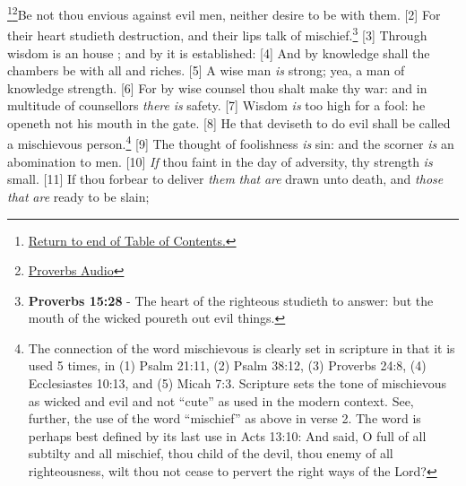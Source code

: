 \footnote{\textcolor[cmyk]{0.99998,1,0,0}{\hyperlink{TOC}{Return to end of Table of Contents.}}}\footnote{\href{https://audiobible.com/bible/}{\textcolor[cmyk]{0.99998,1,0,0}{Proverbs Audio}}}\textcolor[cmyk]{0.99998,1,0,0}{Be not thou envious against evil men, neither desire to be with them.}
[2] \textcolor[cmyk]{0.99998,1,0,0}{For their heart studieth destruction, and their lips talk of mischief.}\footnote{\textbf{Proverbs 15:28} - The heart of the righteous studieth to answer: but the mouth of the wicked poureth out evil things.}
[3] \textcolor[cmyk]{0.99998,1,0,0}{Through wisdom is an house ; and by  it is established:}
[4] \textcolor[cmyk]{0.99998,1,0,0}{And by knowledge shall the chambers be  with all  and  riches.}
[5] \textcolor[cmyk]{0.99998,1,0,0}{A wise man \emph{is} strong; yea, a man of knowledge  strength.}
[6] \textcolor[cmyk]{0.99998,1,0,0}{For by wise counsel thou shalt make thy war: and in multitude of counsellors \emph{there} \emph{is} safety.}
[7] \textcolor[cmyk]{0.99998,1,0,0}{Wisdom \emph{is} too high for a fool: he openeth not his mouth in the gate.}
[8] \textcolor[cmyk]{0.99998,1,0,0}{He that deviseth to do evil shall be called a mischievous person.}\footnote{The connection of the word mischievous is clearly set in scripture in that it is used 5 times, in (1) Psalm 21:11, (2) Psalm 38:12, (3) Proverbs 24:8, (4) Ecclesiastes 10:13, and (5) Micah 7:3. Scripture sets the tone of mischievous as wicked and evil and not ``cute'' as used in the modern context. See, further, the use of the word ``mischief'' as above in verse 2. The word is perhaps best defined by its last use in Acts 13:10: And said, O full of all subtilty and all mischief, thou child of the devil, thou enemy of all righteousness, wilt thou not cease to pervert the right ways of the Lord?}
[9] \textcolor[cmyk]{0.99998,1,0,0}{The thought of foolishness \emph{is} sin: and the scorner \emph{is} an abomination to men.}
[10] \textcolor[cmyk]{0.99998,1,0,0}{\emph{If} thou faint in the day of adversity, thy strength \emph{is} small.}
[11] \textcolor[cmyk]{0.99998,1,0,0}{If thou forbear to deliver \emph{them} \emph{that} \emph{are} drawn unto death, and \emph{those} \emph{that} \emph{are} ready to be slain;}

